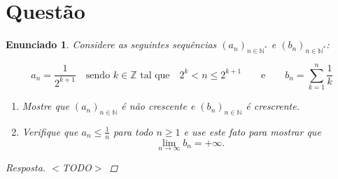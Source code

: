 \documentclass[a4paper,twoside,11pt]{article}
\newtheorem*{enunciado}{Enunciado}
\begin{document}
\section{Questão}
\begin{enunciado}
    Considere as seguintes sequências $(a_n)_{n \in \mathbb{N}^*}$ e $(b_n)_{n \in \mathbb{N}^*}$:

    $$a_n = \dfrac{1}{2^{k + 1}}\quad\text{sendo } k \in \mathbb{Z} \text{ tal que}\quad 2^k < n \leq 2^{k+1} \qquad \text{e} \qquad b_n = \sum_{k=1}^n \dfrac{1}{k}$$

    \begin{enumerate}[label=\alph*)]
        \item Mostre que $(a_n)_{n \in \mathbb{N}}$ é não crescente e 
            $(b_n)_{n \in \mathbb{N}}$ é crescrente.

        \item Verifique que $a_n \leq \frac{1}{n}$ para todo $n \geq 1$ e use este fato
        para mostrar que $$\lim_{n \rightarrow \infty}{b_n} = +\infty.$$
    \end{enumerate}

    \begin{proof}[Resposta]
        $<$TODO$>$
    \end{proof}
\end{enunciado}
\end{document}
